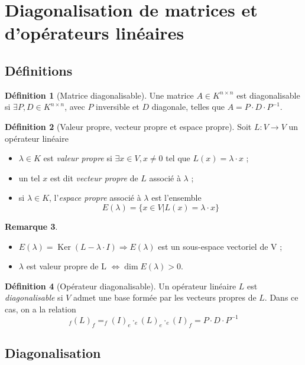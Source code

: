 \documentclass[11pt,a4paper]{article}
\theoremstyle{definition}
\newtheorem{mydef}{Définition}[section]
\newtheorem{myrem}[mydef]{Remarque}
\DeclareMathOperator{\newker}{Ker}
\DeclareMathOperator{\newdim}{dim}
\newcommand*\InsertTheoremBreak{%
  \begingroup %
    \setlength\itemsep{0pt}%
    \setlength\parsep{0pt}%
    \item[\vbox{\null}]%
  \endgroup%
 }%
\begin{document}
\section{Diagonalisation de matrices et d'opérateurs linéaires}

\subsection{Définitions}

\begin{mydef}[Matrice diagonalisable]
Une matrice $A \in K^{n \times n}$ est diagonalisable si $\exists P, D \in K^{n \times n}$, avec $P$ inversible et $D$ diagonale, telles que $A = P \cdot D \cdot P^{-1}$.
\end{mydef}

\begin{mydef}[Valeur propre, vecteur propre et espace propre] Soit $L : V \rightarrow V$ un opérateur linéaire
\begin{itemize}
\item $\lambda \in K$ est \emph{valeur propre} si $\exists x \in V, x \neq 0$ tel que $L(x) = \lambda \cdot x$ ;
\item un tel $x$ est dit \emph{vecteur propre} de $L$ associé à $\lambda$ ;
\item si $\lambda \in K$, l'\emph{espace propre} associé à $\lambda$ est l'ensemble
\[ E(\lambda) = \{ x \in V | L(x) = \lambda \cdot x \} \]
\end{itemize}
\end{mydef}

\begin{myrem}
\InsertTheoremBreak
\begin{itemize}
\item $E(\lambda) = \newker (L - \lambda \cdot I) \Rightarrow E(\lambda)$ est un sous-espace vectoriel de V ;
\item $\lambda$ est valeur propre de L $\Leftrightarrow \newdim E(\lambda) > 0$.
\end{itemize}
\end{myrem}

\begin{mydef}[Opérateur diagonalisable]
Un opérateur linéaire $L$ est \emph{diagonalisable} si $V$ admet une base formée par les vecteurs propres de $L$. Dans ce cas, on a la relation
\[ _f(L)_f = _f\!(I)_e \cdot _e\!(L)_e \cdot _e\!(I)_f = P \cdot D \cdot P^{-1} \]
\end{mydef}

\subsection{Diagonalisation}
\end{document}
